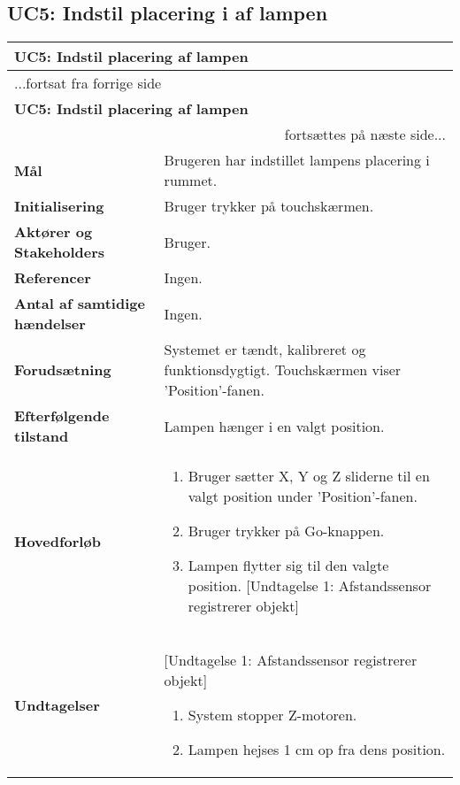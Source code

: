 \subsection{UC5: Indstil placering i af lampen}

\begin{center} \centering
	\begin{longtable}{|p{6cm}|p{8cm}|}
	\hline
		\multicolumn{2}{|l|}{\textbf{UC5: Indstil placering af lampen}} \\\hline
		\endfirsthead
		
		\multicolumn{2}{l}{...fortsat fra forrige side} \\ \hline 
		\multicolumn{2}{|l|}{\textbf{UC5: Indstil placering af lampen}} \\\hline
		\endhead		

        \multicolumn{2}{r}{fortsættes på næste side...} \\
        \endfoot
        \endlastfoot
        
        \textbf{Mål}								
            & Brugeren har indstillet lampens placering i rummet.
        \\ \hline
        \textbf{Initialisering}					
            & Bruger trykker på touchskærmen.
        \\ \hline
        \textbf{Aktører og Stakeholders}			
            & Bruger.
        \\ \hline
        \textbf{Referencer}						
            & Ingen.
        \\ \hline
        \textbf{Antal af samtidige hændelser}	
            & Ingen.
        \\ \hline
        \textbf{Forudsætning}					
            & Systemet er tændt, kalibreret og funktionsdygtigt. Touchskærmen viser 'Position'-fanen.
        \\ \hline
        \textbf{Efterfølgende tilstand}			
            & Lampen hænger i en valgt position.
        \\ \hline
        \textbf{Hovedforløb}						
            &
            \begin{enumerate}
                \item Bruger sætter X, Y og Z sliderne til en valgt position under 'Position'-fanen.
                \item Bruger trykker på Go-knappen.
                \item Lampen flytter sig til den valgte position.
                [Undtagelse 1: Afstandssensor registrerer objekt]
            \end{enumerate}
        \\ \hline
        \textbf{Undtagelser}						
            & [Undtagelse 1: Afstandssensor registrerer objekt]
            \begin{enumerate}
			    \item System stopper Z-motoren.
			    \item Lampen hejses 1 cm op fra dens position.
		    \end{enumerate}
        \\ \hline
	\end{longtable}
	\label{UC6} 
\end{center}